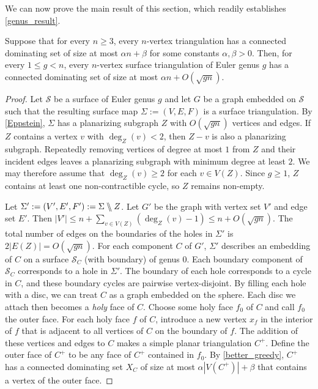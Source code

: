 \documentclass{patmorin}
\begin{document}
We can now prove the main result of this section, which readily establishes \cref{genus_result}.

\begin{lem}\label{generic_surface_thm}
  Suppose that for every $n\ge 3$, every $n$-vertex triangulation has a connected dominating set of size at most $\alpha n + \beta$ for some constants $\alpha, \beta>0$. Then, for every $1\le g < n$, every $n$-vertex surface triangulation of Euler genus $g$ has a connected dominating set of size at most $\alpha n + O(\sqrt{gn})$.
\end{lem}

\begin{proof}
  Let $\mathcal{S}$ be a surface of Euler genus $g$ and let $G$ be a graph embedded on $\mathcal{S}$ such that the resulting surface map $\Sigma:=(V,E,F)$ is a surface triangulation.
  By \cref{Eppstein}, $\Sigma$ has a planarizing subgraph $Z$ with $O(\sqrt{gn})$ vertices and edges.  If $Z$ contains a vertex $v$ with $\deg_Z(v)<2$, then $Z-v$ is also a planarizing subgraph. Repeatedly removing vertices of degree at most $1$ from $Z$ and their incident edges leaves a planarizing subgraph with minimum degree at least $2$. We may therefore assume that $\deg_Z(v)\ge 2$ for each $v\in V(Z)$.  
Since $g \ge 1$, $Z$ contains at least one non-contractible cycle, so $Z$ remains non-empty.

Let $\Sigma':=(V',E',F'):=\Sigma\bbslash Z$.  Let $G'$ be the graph with vertex set $V'$ and edge set $E'$.  Then $|V'|\le n + \sum_{v\in V(Z)}(\deg_Z(v)-1) \le n + O(\sqrt{gn})$. The total number of edges on the boundaries of the holes in $\Sigma'$ is $2|E(Z)|=O(\sqrt{gn})$.
For each component $C$ of $G'$, $\Sigma'$ describes an embedding of $C$ on a surface $\mathcal{S}_C$ (with boundary) of genus $0$.  Each boundary component of $\mathcal{S}_C$ corresponds to a hole in $\Sigma'$.  The boundary of each hole corresponds to a cycle in $C$, and these boundary cycles are pairwise vertex-disjoint.  By filling each hole with a disc, we can treat $C$ as a graph embedded on the sphere. Each disc we attach then becomes a \emph{holy} face of $C$.  Choose some holy face $f_0$ of $C$ and call $f_0$ the outer face.   For each holy face $f$ of $C$, introduce a new vertex $x_f$ in the interior of $f$ that is adjacent to all vertices of $C$ on the boundary of $f$. The addition of these vertices and edges to $C$ makes a simple planar triangulation $C^+$. Define the outer face of $C^+$ to be any face of $C^+$ contained in $f_0$. By \cref{better_greedy}, $C^+$ has a connected dominating set $X_C$ of size at most $\alpha|V(C^+)|+\beta$ that contains a vertex of the outer face.


\end{proof}
\end{document}

